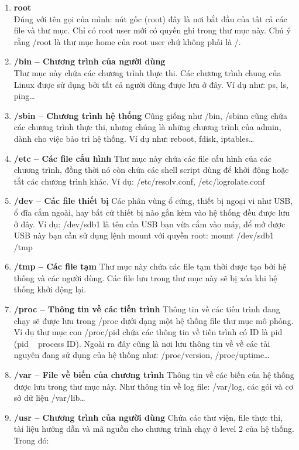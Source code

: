 \documentclass[twoside]{article}
\begin{document}
	\begin{enumerate}
		\item \textbf{root} \\
		Đúng với tên gọi của mình: nút gốc (root) đây là nơi bắt đầu của tất cả các file và thư mục. Chỉ có root user mới có quyền ghi trong thư mục này. Chú ý rằng /root là thư mục home của root user chứ không phải là /.
		\item \textbf{/bin – Chương trình của người dùng} \\
		Thư mục này chứa các chương trình thực thi. Các chương trình chung của Linux được sử dụng bởi tất cả người dùng được lưu ở đây. Ví dụ như: ps, ls, ping…
		\item \textbf{/sbin – Chương trình hệ thống}
		Cũng giống như /bin, /sbinn cũng chứa các chương trình thực thi, nhưng chúng là những chương trình của admin, dành cho việc bảo trì hệ thống. Ví dụ như: reboot, fdisk, iptables…
		\item \textbf{/etc – Các file cấu hình}
		Thư mục này chứa các file cấu hình của các chương trình, đồng thời nó còn chứa các shell script dùng để khởi động hoặc tắt các chương trình khác. Ví dụ: /etc/resolv.conf, /etc/logrolate.conf
		\item \textbf{/dev – Các file thiết bị}
		Các phân vùng ổ cứng, thiết bị ngoại vi như USB, ổ đĩa cắm ngoài, hay bất cứ thiết bị nào gắn kèm vào hệ thống đều được lưu ở đây. Ví dụ: /dev/sdb1 là tên của USB bạn vừa cắm vào máy, để mở được USB này bạn cần sử dụng lệnh mount với quyền root: mount /dev/sdb1 /tmp
		\item \textbf{/tmp – Các file tạm}
		Thư mục này chứa các file tạm thời được tạo bởi hệ thống và các người dùng. Các file lưu trong thư mục này sẽ bị xóa khi hệ thống khởi động lại.
		\item \textbf{/proc – Thông tin về các tiến trình}
		Thông tin về các tiến trình đang chạy sẽ được lưu trong /proc dưới dạng một hệ thống file thư mục mô phỏng. Ví dụ thư mục con /proc/{pid} chứa các thông tin về tiến trình có ID là pid (pid ~ process ID). Ngoài ra đây cũng là nơi lưu thông tin về về các tài nguyên đang sử dụng của hệ thống như: /proc/version, /proc/uptime…
		\item \textbf{/var – File về biến của chương trình}
		Thông tin về các biến của hệ thống được lưu trong thư mục này. Như thông tin về log file: /var/log, các gói và cơ sở dữ liệu /var/lib…
		\item \textbf{/usr – Chương trình của người dùng}
		Chứa các thư viện, file thực thi, tài liệu hướng dẫn và mã nguồn cho chương trình chạy ở level 2 của hệ thống. Trong đó:

\end{enumerate}
\end{document}
